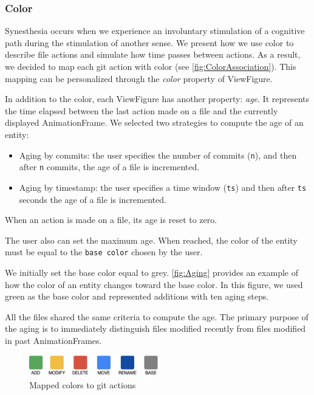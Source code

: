 \subsubsection*{Color}

Synesthesia occurs when we experience an involuntary stimulation of a cognitive path during the stimulation of another sense.
We present how we use color to describe file actions and simulate how time passes between actions.
As a result, we decided to map each git action with color (see \autoref{fig:ColorAssociation}). This mapping can be personalized through the \textit{color} property of ViewFigure.

In addition to the color, each ViewFigure has another property: \textit{age}. It represents the time elapsed between the last action made on a file and the currently displayed AnimationFrame. 
We selected two strategies to compute the age of an entity:

\begin{itemize}
    \item{Aging by commits}: the user specifies the number of commits (\texttt{n}), and then after \texttt{n} commits, the age of a file is incremented. 
    \item{Aging by timestamp}:  the user specifies a time window (\texttt{ts}) and then after \texttt{ts} seconds the age of a file is incremented.
\end{itemize}

When an action is made on a file, its age is reset to zero. 

The user also can set the maximum age.
When reached, the color of the entity must be equal to the \texttt{base color} chosen by the user.
 
We initially set the base color equal to grey.
\autoref{fig:Aging} provides an example of how the color of an entity changes toward the base color. In this figure, we used green as the base color and represented additions with ten aging steps. 


All the files shared the same criteria to compute the age. The primary purpose of the aging is to immediately distinguish files modified recently from files modified in past AnimationFrames.

\begin{figure}
    \center
    \includegraphics[width=0.5\textwidth]{ColorMapping.jpg}
    \caption{Mapped colors to git actions}
    \label{fig:ColorAssociation}
\end{figure}


